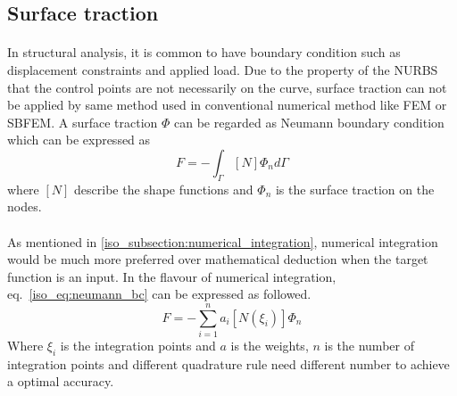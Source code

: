 \subsection{Surface traction}
\label{subsection:surface_traction}
\paragraph{}
In structural analysis, it is common to have boundary condition such as displacement constraints and applied load.
Due to the property of the NURBS that the control points are not necessarily on the curve, surface traction can not be
    applied by same method used in conventional numerical method like FEM or SBFEM.
A surface traction $\Phi$ can be regarded as Neumann boundary condition which can be expressed as
    \begin{equation}
        {F}=-\int_{\Gamma}
        [N]
        \Phi_n
        d\Gamma
    \label{iso_eq:neumann_bc}
    \end{equation}
where $[N]$ describe the shape functions and $\Phi_n$ is the surface traction on the nodes.

\paragraph{}
As mentioned in \ref{iso_subsection:numerical_integration}, numerical integration would be much more preferred over mathematical deduction
when the target function is an input. In the flavour of numerical integration, eq.~\ref{iso_eq:neumann_bc} can be expressed as followed.
    \begin{equation}
        {F}=-\sum_{i=1}^n
        a_i
        [N(\xi_i)]
        \Phi_n
    \label{iso_eq:neumann_bc_numerical}
    \end{equation}
Where $\xi_i$ is the integration points and $a$ is the weights,
$n$ is the number of integration points and different quadrature rule need different number to achieve a optimal accuracy.

